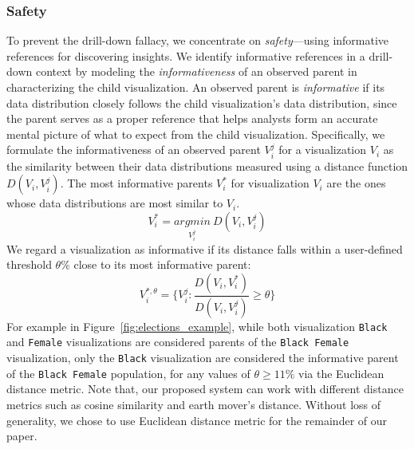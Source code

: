 \subsubsection{Safety}
To prevent the drill-down fallacy, we concentrate on \emph{safety}---using informative references for discovering insights. We identify informative references in a drill-down context by modeling the \emph{informativeness} of an observed parent in characterizing the child visualization. An observed parent is \emph{informative} if its data distribution closely follows the child visualization's data distribution, since the parent serves as a proper reference that helps analysts form an accurate mental picture of what to expect from the child visualization. Specifically, we formulate the informativeness of an observed parent $V_i^j$ for a visualization $V_i$ as the similarity between their data distributions measured using a distance function $D(V_i, V_i^j)$. The most informative parents $V_i^*$ for visualization $V_i$ are the ones whose data distributions are most similar to $V_i$.
\begin{equation}
    V_i^*=\underset{V_i^j}{argmin}\ D(V_i, V_i^j)
\end{equation}
We regard a visualization as informative if its distance falls within a user-defined threshold $\theta\%$ close to its most informative parent:
\begin{equation}
    V_i^{*, \theta} = \{V_i^j : \frac{D(V_i, V_i^*)}{D(V_i, V_i^j)} \geq \theta\}
\end{equation}
For example in Figure~\ref{fig:elections_example}, while both visualization \texttt{Black} and \texttt{Female} visualizations are considered parents of the \texttt{Black Female} visualization, only the \texttt{Black} visualization are considered the informative parent of the \texttt{Black Female} population, for any values of $\theta \geq 11\%$ via the Euclidean distance metric. Note that, our proposed system can work with different distance metrics such as cosine similarity and earth mover's distance. Without loss of generality, we chose to use Euclidean distance metric for the remainder of our paper.


